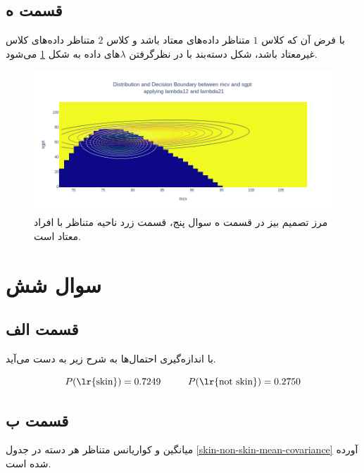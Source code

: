 \documentclass{article}
\begin{document}
\subsection*{قسمت ه}

با فرض آن که کلاس $1$ متناظر داده‌های معتاد باشد و کلاس $2$ متناظر داده‌های کلاس غیرمعتاد باشد،
شکل دسته‌بند با در نظرگرفتن $\lambda$های داده به شکل \ref{bayes-decision-lambda-boundary} می‌شود.

\begin{figure}[h]
    \centering
    \includegraphics[scale=0.3]{images/q5/bayes_decision_lambda.png}
    \caption{مرز تصمیم بیز در قسمت ه سوال پنج، قسمت زرد ناحیه متناظر با افراد معتاد است.}
    \label{bayes-decision-lambda-boundary}
\end{figure}

\section*{سوال شش}

\subsection*{قسمت الف}

با اندازه‌گیری احتمال‌ها به شرح زیر به دست می‌آید.

$$P(\text{\lr{skin}}) = 0.7249 \hspace{1cm} P(\text{\lr{not skin}}) = 0.2750$$

\subsection*{قسمت ب}

میانگین و کواریانس متناظر هر دسته در جدول \ref{skin-non-skin-mean-covariance} آورده شده است.
\end{document}
